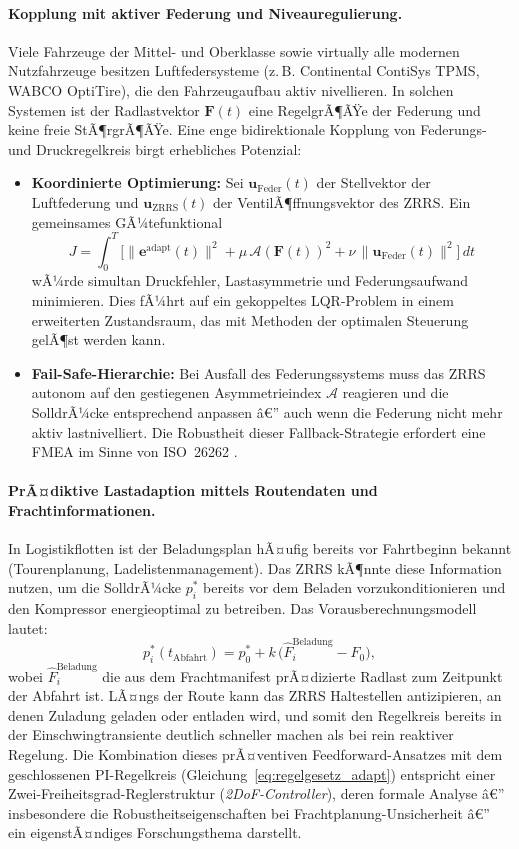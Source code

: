 ﻿\documentclass[a4paper,12pt]{article}
\theoremstyle{definition}
\begin{document}
\paragraph{Kopplung mit aktiver Federung und Niveauregulierung.}
Viele Fahrzeuge der Mittel- und Oberklasse sowie virtually alle modernen
Nutzfahrzeuge besitzen Luftfedersysteme (z.\,B. Continental ContiSys TPMS,
WABCO OptiTire), die den Fahrzeugaufbau aktiv nivellieren. In solchen
Systemen ist der Radlastvektor $\mathbf{F}(t)$ eine RegelgrÃ¶ÃŸe der
Federung und keine freie StÃ¶rgrÃ¶ÃŸe. Eine enge bidirektionale
Kopplung von Federungs- und Druckregelkreis birgt erhebliches Potenzial:
\begin{itemize}
    \item \textbf{Koordinierte Optimierung:} Sei
    $\mathbf{u}_{\text{Feder}}(t)$ der Stellvektor der Luftfederung und
    $\mathbf{u}_{\text{ZRRS}}(t)$ der VentilÃ¶ffnungsvektor des ZRRS.
    Ein gemeinsames GÃ¼tefunktional
    \[
        J = \int_0^T \bigl[\|\mathbf{e}^{\text{adapt}}(t)\|^2
        + \mu\,\mathcal{A}(\mathbf{F}(t))^2
        + \nu\,\|\mathbf{u}_{\text{Feder}}(t)\|^2\bigr]\,dt
    \]
    wÃ¼rde simultan Druckfehler, Lastasymmetrie und Federungsaufwand
    minimieren. Dies fÃ¼hrt auf ein gekoppeltes LQR-Problem in einem
    erweiterten Zustandsraum, das mit Methoden der optimalen
    Steuerung \cite{astroem} gelÃ¶st werden kann.
    \item \textbf{Fail-Safe-Hierarchie:} Bei Ausfall des Federungssystems
    muss das ZRRS autonom auf den gestiegenen Asymmetrieindex $\mathcal{A}$
    reagieren und die SolldrÃ¼cke entsprechend anpassen â€” auch wenn die
    Federung nicht mehr aktiv lastnivelliert. Die Robustheit dieser
    Fallback-Strategie erfordert eine FMEA im Sinne von ISO~26262 \cite{iso26262}.
\end{itemize}

\paragraph{PrÃ¤diktive Lastadaption mittels Routendaten und Frachtinformationen.}
In Logistikflotten ist der Beladungsplan hÃ¤ufig bereits vor Fahrtbeginn
bekannt (Tourenplanung, Ladelistenmanagement). Das ZRRS kÃ¶nnte diese
Information nutzen, um die SolldrÃ¼cke $p^*_i$ bereits vor dem Beladen
vorzukonditionieren und den Kompressor energieoptimal zu betreiben.
Das Vorausberechnungsmodell lautet:
\[
    p^*_i(t_{\text{Abfahrt}}) = p^*_0 + k\,\bigl(\hat{F}_i^{\text{Beladung}} - F_0\bigr),
\]
wobei $\hat{F}_i^{\text{Beladung}}$ die aus dem Frachtmanifest prÃ¤dizierte
Radlast zum Zeitpunkt der Abfahrt ist. LÃ¤ngs der Route kann das ZRRS
Haltestellen antizipieren, an denen Zuladung geladen oder entladen wird,
und somit den Regelkreis bereits in der Einschwingtransiente deutlich
schneller machen als bei rein reaktiver Regelung. Die Kombination dieses
prÃ¤ventiven Feedforward-Ansatzes mit dem geschlossenen PI-Regelkreis
(Gleichung~\eqref{eq:regelgesetz_adapt}) entspricht einer
Zwei-Freiheitsgrad-Reglerstruktur (\emph{2DoF-Controller}), deren
formale Analyse â€” insbesondere die Robustheitseigenschaften bei
Frachtplanung-Unsicherheit â€” ein eigenstÃ¤ndiges Forschungsthema darstellt.
\end{document}
